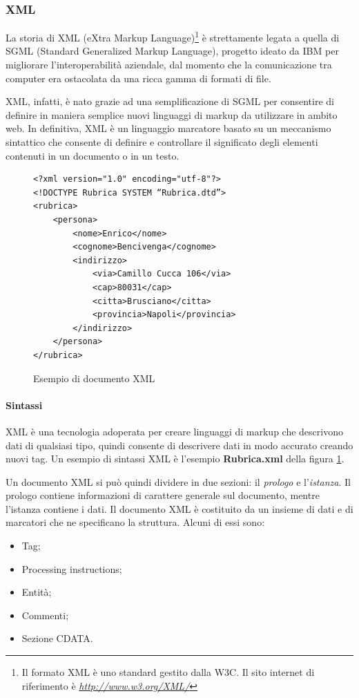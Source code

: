 \subsubsection{XML}
La storia di XML (eXtra Markup Language)\footnote{Il formato XML è uno standard gestito dalla W3C. Il sito internet di riferimento è \emph{\url{http://www.w3.org/XML/}}} è strettamente legata a quella di SGML (Standard Generalized Markup Language), progetto ideato da IBM per migliorare l'interoperabilità aziendale, dal momento che la comunicazione tra computer era ostacolata da una ricca gamma di formati di file.

XML, infatti, è nato grazie ad una semplificazione di SGML per consentire di definire in maniera semplice nuovi linguaggi di markup da utilizzare in ambito web.
In definitiva, XML è un linguaggio marcatore basato su un meccanismo sintattico che consente di definire e controllare il significato degli elementi contenuti in un documento o in un testo.

\begin{figure}
\begin{center}
\lstset{language=MYXML}
\begin{lstlisting}
<?xml version="1.0" encoding="utf-8"?>
<!DOCTYPE Rubrica SYSTEM “Rubrica.dtd”>
<rubrica>
	<persona>
		<nome>Enrico</nome>
		<cognome>Bencivenga</cognome>
		<indirizzo>
			<via>Camillo Cucca 106</via>
			<cap>80031</cap>
			<citta>Brusciano</citta>
			<provincia>Napoli</provincia>
		</indirizzo>
	</persona>
</rubrica>

\end{lstlisting}
\caption{Esempio di documento XML\label{xmlimage}}
\end{center}
\end{figure}


\paragraph{Sintassi}
XML è una tecnologia adoperata per creare linguaggi di markup che descrivono dati di qualsiasi tipo, quindi consente di descrivere dati in modo accurato creando nuovi tag.
Un esempio di sintassi XML è l'esempio \textbf{Rubrica.xml} della figura \ref{xmlimage}.


Un documento XML si può quindi dividere in due sezioni: il \textit{prologo} e l'\textit{istanza}. 
Il prologo contiene informazioni di carattere generale sul documento, mentre l'istanza contiene i dati. Il documento XML è costituito da un insieme di dati e di marcatori che ne specificano la struttura.
Alcuni di essi sono:
\begin{itemize}
\item Tag;
\item Processing instructions;
\item Entità;
\item Commenti;
\item Sezione CDATA.
\end{itemize}

